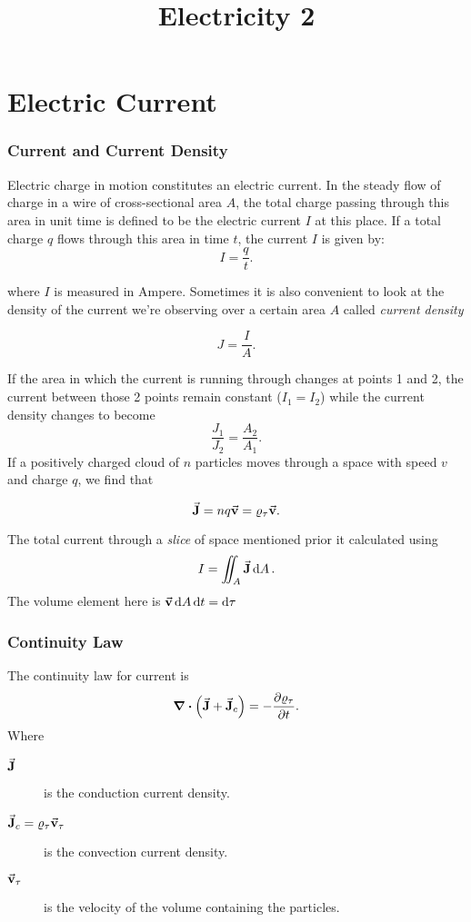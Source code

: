 \documentclass[a4paper,12pt]{article}
\title{Electricity 2}
\date{}
\begin{document}
\maketitle

\part{Electric Current}
\section{Current and Current Density}

Electric charge in motion constitutes an electric current. In the steady flow of
charge in a wire of cross-sectional area $A$, the total charge passing through this
area in unit time is defined to be the electric current $I$ at this place. If a total
charge $q$ flows through this area in time $t$, the current $I$ is given by:
\begin{equation}
I = \frac{q}{t}
.\end{equation}

where $I$ is measured in Ampere. Sometimes it is also convenient to look at the density of the current we're observing over a certain area $A$ called \emph{current density}

\begin{equation}
J=\frac{I}{A}
.\end{equation}

If the area in which the current is running through changes at points  1 and 2, the current between those 2 points remain constant ($I_1=I_2$) while the current density changes to become 
\[
\frac{J_1}{J_2}=\frac{A_2}{A_1}
.\] 
If a positively charged cloud of $n$ particles moves through a space with speed $v$ and charge $q$, we find that 

\begin{equation}
    \va{J}=nq\va{v}=\varrho_\tau \va{v}
.\end{equation}

The total current through a \emph{slice} of space mentioned prior it calculated using
\begin{equation}
    I=\iint_A \va{J}\dd{A}
.\end{equation} 
The volume element here is $\va{v}\dd {A}\dd {t}=\dd {\tau}$

\section{Continuity Law}
The continuity law for current is
\begin{equation}
    \div(\va{J}+\va{J}_c)=-\pdv{\varrho_\tau}{t} 
.\end{equation} 
Where
\begin{description}
    \item[$\va{J}$ ] is the conduction current density.
    \item[$\va{J}_c=\varrho_\tau\va{v}_\tau$ ] is the convection current density.
    \item [$\va{v}_\tau$] is the velocity of the volume containing the particles.
\end{description}
\end{document}
